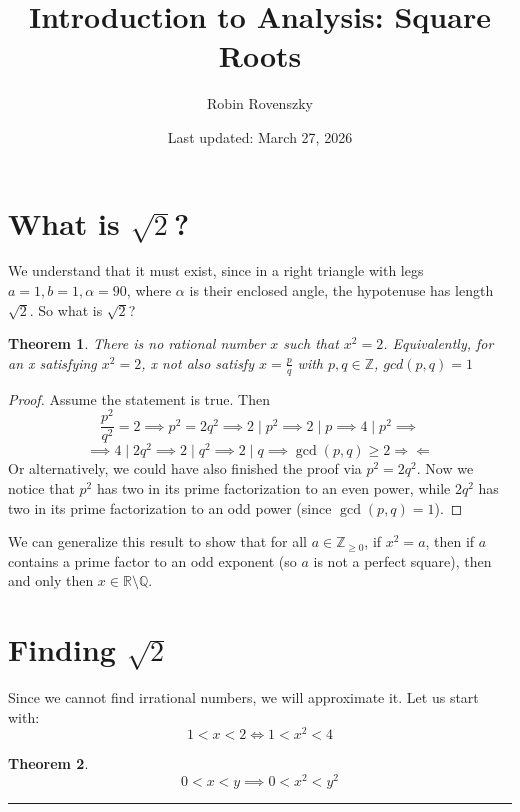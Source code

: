 \documentclass{article}
\title{Introduction to Analysis: Square Roots}
\author{Robin Rovenszky}
\date{Last updated: March 27, 2026}
\newtheorem{theorem}{Theorem}
\begin{document}
\maketitle
\tableofcontents
\newpage

\section{What is $\sqrt{2}$?}
We understand that it must exist, since in a right triangle with legs $a = 1, b= 1, \alpha = 90$, where $\alpha$ is their enclosed angle, the hypotenuse has length $\sqrt{2}$. So what is $\sqrt{2}$?

\begin{theorem}
    There is no rational number $x$ such that $x^2 = 2$. Equivalently, for an x satisfying $x^2 = 2$, x not also satisfy $x = \frac{p}{q}$ with $p, q \in \mathbb{Z}$, $gcd(p, q) = 1$
\end{theorem}
\begin{proof}
    Assume the statement is true. Then
    \begin{equation}
        \frac{p^2}{q^2} = 2 \implies p^2 = 2q^2 \implies 2 \mid p^2 \implies 2 \mid p \implies 4 \mid p^2 \implies
    \end{equation}
    \begin{equation}
        \implies 4 \mid 2q^2 \implies 2 \mid q^2 \implies 2 \mid q \implies \gcd(p, q) \ge 2 \Rightarrow\!\Leftarrow
    \end{equation}
    Or alternatively, we could have also finished the proof via
    $p^2 = 2q^2$. Now we notice that $p^2$ has two in its prime factorization to an even power, while $2q^2$ has two in its prime factorization to an odd power (since $\gcd(p,q) = 1$).
\end{proof}

We can generalize this result to show that for all $a \in \mathbb{Z}_{\ge 0}$, if $x^2 = a$, then if $a$ contains a prime factor to an odd exponent (so $a$ is not a perfect square), then and only then $x \in \mathbb{R} \setminus \mathbb{Q}$.

\section{Finding $\sqrt{2}$}
Since we cannot find irrational numbers, we will approximate it. Let us start with:
\[
1 < x < 2 \Leftrightarrow 1 < x^2 < 4
\]
\begin{theorem}
    \[
    0 < x < y \implies 0 < x^2 < y^2
    \]
\end{theorem}
\hrule
\vspace{1em}
\end{document}
